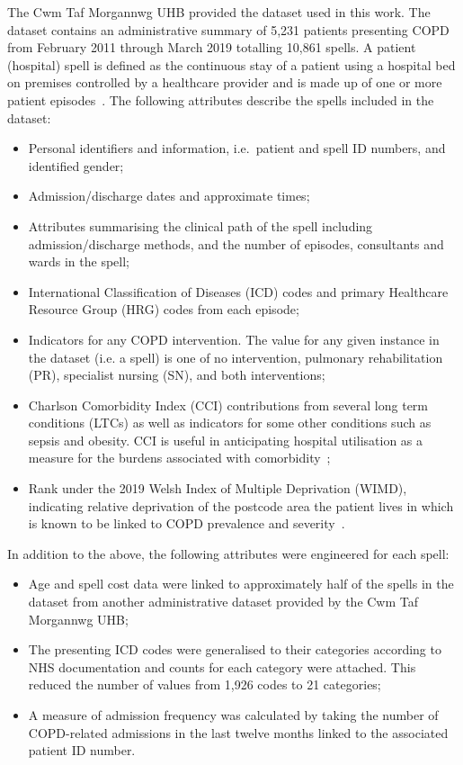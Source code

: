 \documentclass[11pt]{article}
\begin{document}
The Cwm Taf Morgannwg UHB provided the dataset used in this work. The
dataset contains an administrative summary of 5,231 patients presenting COPD
from February 2011 through March 2019 totalling 10,861 spells. A patient
(hospital) spell is defined as the continuous stay of a patient using a hospital
bed on premises controlled by a healthcare provider and is made up of one or
more patient episodes~\cite{NHS2020}. The following attributes describe the
spells included in the dataset:
\begin{itemize}
    \item Personal identifiers and information, i.e.\ patient and spell ID
        numbers, and identified gender;
    \item Admission/discharge dates and approximate times;
    \item Attributes summarising the clinical path of the spell including
        admission/discharge methods, and the number of episodes, consultants and
        wards in the spell;
    \item International Classification of Diseases (ICD) codes and primary
        Healthcare Resource Group (HRG) codes from each episode;
    \item Indicators for any COPD intervention. The value for any given instance
        in the dataset (i.e. a spell) is one of no intervention, pulmonary
        rehabilitation (PR), specialist nursing (SN), and both interventions;
    \item Charlson Comorbidity Index (CCI) contributions from several long term
        conditions (LTCs) as well as indicators for some other conditions such
        as sepsis and obesity. CCI is useful in anticipating hospital
        utilisation as a measure for the burdens associated with
        comorbidity~\cite{Simon2011};
    \item Rank under the 2019 Welsh Index of Multiple Deprivation (WIMD),
        indicating relative deprivation of the postcode area the patient lives
        in which is known to be linked to COPD prevalence and
        severity~\cite{Collins2018,Sexton2016,Steiner2017}.
\end{itemize}

In addition to the above, the following attributes were engineered for each
spell:
\begin{itemize}
    \item Age and spell cost data were linked to approximately half of the
        spells in the dataset from another administrative dataset provided by
        the Cwm Taf Morgannwg UHB;
    \item The presenting ICD codes were generalised to their categories
        according to NHS documentation and counts for each category were
        attached. This reduced the number of values from
        1,926 codes to 21 categories;
    \item A measure of admission frequency was calculated by taking the number
        of COPD-related admissions in the last twelve months linked to the
        associated patient ID number.
\end{itemize}
\end{document}

